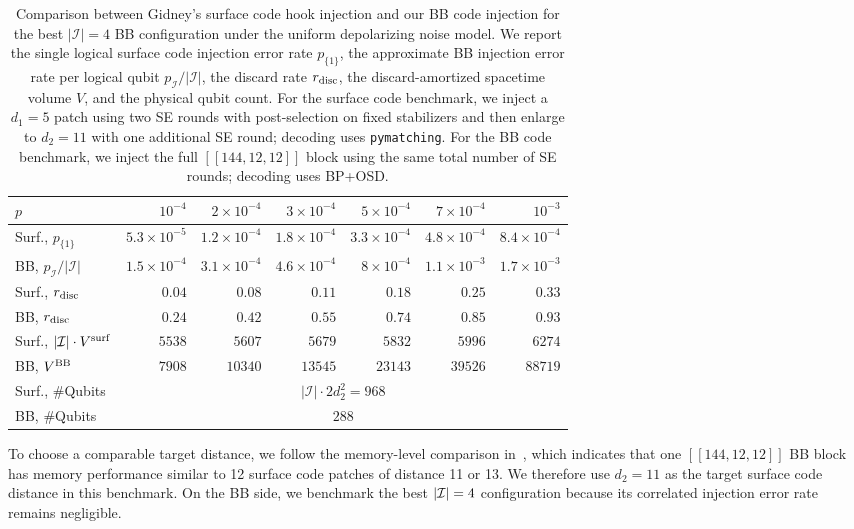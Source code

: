 \begin{table}[htb]
    {\setlength{\tabcolsep}{8pt}
\begin{tabular}{lrrrrrr}
\toprule
$p$ & $10^{-4}$ & $2 \times 10^{-4}$ & $3 \times 10^{-4}$ & $5 \times 10^{-4}$ & $7 \times 10^{-4}$ & $10^{-3}$ \\
\midrule
Surf., $p_{\{1\}}$ & $5.3 \times 10^{-5}$ & $1.2 \times 10^{-4}$ & $1.8 \times 10^{-4}$ & $3.3 \times 10^{-4}$ & $4.8 \times 10^{-4}$ & $8.4 \times 10^{-4}$ \\
BB, $p_{\mathcal{I}}/|\mathcal{I}|$ & $1.5 \times 10^{-4}$ & $3.1 \times 10^{-4}$ & $4.6 \times 10^{-4}$ & $8 \times 10^{-4}$ & $1.1 \times 10^{-3}$ & $1.7 \times 10^{-3}$ \\
\midrule
Surf., $r_{\rm disc}$ & $0.04$ & $0.08$ & $0.11$ & $0.18$ & $0.25$ & $0.33$ \\
BB, $r_{\rm disc}$ & $0.24$ & $0.42$ & $0.55$ & $0.74$ & $0.85$ & $0.93$ \\
\midrule
Surf., $|\mathcal{I}|\cdot V^{\rm surf}$ & $5538$ & $5607$ & $5679$ & $5832$ & $5996$ & $6274$ \\
BB, $V^{\rm BB}$ & $7908$ & $10340$ & $13545$ & $23143$ & $39526$ & $88719$ \\
\midrule
Surf., \#Qubits & \multicolumn{6}{c}{$|\mathcal{I}|\cdot 2d_2^2 = 968$} \\
BB, \#Qubits & \multicolumn{6}{c}{$288$} \\
\bottomrule
\end{tabular}
}
\caption{
Comparison between Gidney's surface code hook injection and our BB code injection for the best $|\mathcal{I}|=4$ BB configuration under the uniform depolarizing noise model. We report the single logical surface code injection error rate $p_{\{1\}}$, the approximate BB injection error rate per logical qubit $p_{\mathcal{I}}/|\mathcal{I}|$, the discard rate $r_{\rm disc}$, the discard-amortized spacetime volume $V$, and the physical qubit count. For the surface code benchmark, we inject a $d_1=5$ patch using two SE rounds with post-selection on fixed stabilizers and then enlarge to $d_2=11$ with one additional SE round; decoding uses \texttt{pymatching}. For the BB code benchmark, we inject the full $[[144,12,12]]$ block using the same total number of SE rounds; decoding uses BP+OSD.
}
\label{tab:cmp-surface-bb}
\end{table}

To choose a comparable target distance, we follow the memory-level comparison in~\cite[Fig.~2]{bravyi_high-threshold_2024}, which indicates that one $[[144,12,12]]$ BB block has memory performance similar to 12 surface code patches of distance 11 or 13. We therefore use $d_2=11$ as the target surface code distance in this benchmark. On the BB side, we benchmark the best $|\mathcal{I}|=4$ configuration because its correlated injection error rate remains negligible.

